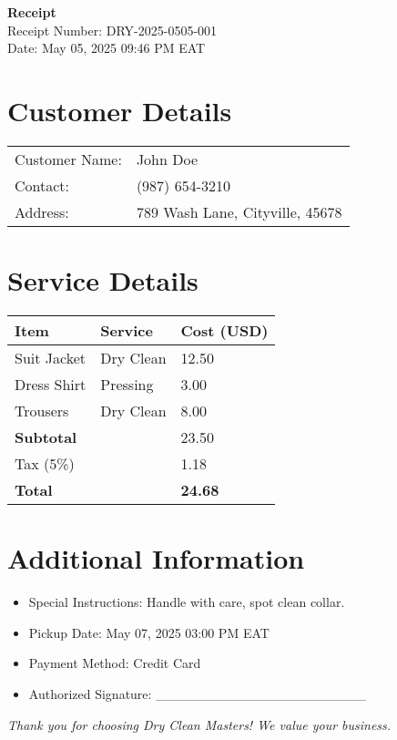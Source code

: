 \documentclass[a4paper,12pt]{article}
\begin{document}
\begin{center}
    \LARGE{\textbf{Receipt}} \\
    \vspace{0.2cm}
    \large{Receipt Number: DRY-2025-0505-001} \\
    \large{Date: May 05, 2025 09:46 PM EAT}
\end{center}

\section*{Customer Details}
\begin{tabular}{p{3cm} p{8cm}}
    Customer Name: & John Doe \\
    Contact: & (987) 654-3210 \\
    Address: & 789 Wash Lane, Cityville, 45678 \\
\end{tabular}

\section*{Service Details}
\begin{tabular}{|p{4cm}|p{3cm}|p{3cm}|}
    \hline
    \textbf{Item} & \textbf{Service} & \textbf{Cost (USD)} \\
    \hline
    Suit Jacket & Dry Clean & 12.50 \\
    Dress Shirt & Pressing & 3.00 \\
    Trousers & Dry Clean & 8.00 \\
    \hline
    \textbf{Subtotal} & & 23.50 \\
    Tax (5\%) & & 1.18 \\
    \hline
    \textbf{Total} & & \textbf{24.68} \\
    \hline
\end{tabular}

\section*{Additional Information}
\begin{itemize}
    \item Special Instructions: Handle with care, spot clean collar.
    \item Pickup Date: May 07, 2025 03:00 PM EAT
    \item Payment Method: Credit Card
    \item Authorized Signature: ______________________
\end{itemize}

\begin{center}
    \textit{Thank you for choosing Dry Clean Masters! We value your business.}
\end{center}
\end{document}
